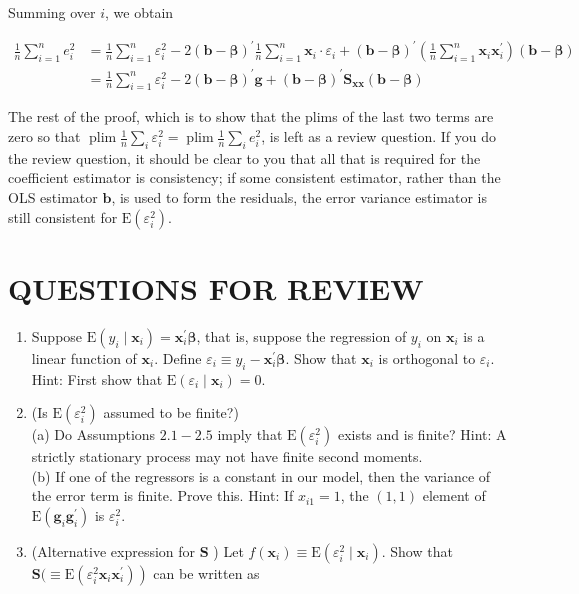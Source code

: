 \documentclass[10pt]{article}
\begin{document}
Summing over $i$, we obtain


\begin{align*}
\frac{1}{n} \sum_{i=1}^{n} e_{i}^{2} & =\frac{1}{n} \sum_{i=1}^{n} \varepsilon_{i}^{2}-2(\mathbf{b}-\boldsymbol{\beta})^{\prime} \frac{1}{n} \sum_{i=1}^{n} \mathbf{x}_{i} \cdot \varepsilon_{i}+(\mathbf{b}-\boldsymbol{\beta})^{\prime}\left(\frac{1}{n} \sum_{i=1}^{n} \mathbf{x}_{i} \mathbf{x}_{i}^{\prime}\right)(\mathbf{b}-\boldsymbol{\beta}) \\
& =\frac{1}{n} \sum_{i=1}^{n} \varepsilon_{i}^{2}-2(\mathbf{b}-\boldsymbol{\beta})^{\prime} \mathbf{g}+(\mathbf{b}-\boldsymbol{\beta})^{\prime} \mathbf{S}_{\mathbf{x x}}(\mathbf{b}-\boldsymbol{\beta}) \tag{2.3.11}
\end{align*}


The rest of the proof, which is to show that the plims of the last two terms are zero so that $\operatorname{plim} \frac{1}{n} \sum_{i} \varepsilon_{i}^{2}=\operatorname{plim} \frac{1}{n} \sum_{i} e_{i}^{2}$, is left as a review question. If you do the review question, it should be clear to you that all that is required for the coefficient estimator is consistency; if some consistent estimator, rather than the OLS estimator $\mathbf{b}$, is used to form the residuals, the error variance estimator is still consistent for $\mathrm{E}\left(\varepsilon_{i}^{2}\right)$.

\section*{QUESTIONS FOR REVIEW}
\begin{enumerate}
  \item Suppose $\mathrm{E}\left(y_{i} \mid \mathbf{x}_{i}\right)=\mathbf{x}_{i}^{\prime} \boldsymbol{\beta}$, that is, suppose the regression of $y_{i}$ on $\mathbf{x}_{i}$ is a linear function of $\mathbf{x}_{i}$. Define $\varepsilon_{i} \equiv y_{i}-\mathbf{x}_{i}^{\prime} \boldsymbol{\beta}$. Show that $\mathbf{x}_{i}$ is orthogonal to $\varepsilon_{i}$. Hint: First show that $\mathrm{E}\left(\varepsilon_{i} \mid \mathbf{x}_{i}\right)=0$.
  \item (Is $\mathrm{E}\left(\varepsilon_{i}^{2}\right)$ assumed to be finite?)\\
(a) Do Assumptions $2.1-2.5$ imply that $\mathrm{E}\left(\varepsilon_{i}^{2}\right)$ exists and is finite? Hint: A strictly stationary process may not have finite second moments.\\
(b) If one of the regressors is a constant in our model, then the variance of the error term is finite. Prove this. Hint: If $x_{i 1}=1$, the $(1,1)$ element of $\mathrm{E}\left(\mathbf{g}_{i} \mathbf{g}_{i}^{\prime}\right)$ is $\varepsilon_{i}^{2}$.
  \item (Alternative expression for $\mathbf{S}$ ) Let $f\left(\mathbf{x}_{i}\right) \equiv \mathrm{E}\left(\varepsilon_{i}^{2} \mid \mathbf{x}_{i}\right)$. Show that $\mathbf{S}(\equiv \left.\mathrm{E}\left(\varepsilon_{i}^{2} \mathbf{x}_{i} \mathbf{x}_{i}^{\prime}\right)\right)$ can be written as
\end{enumerate}
\end{document}
